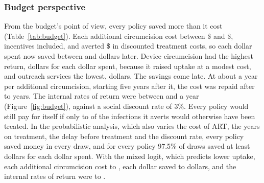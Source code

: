 \documentclass[11pt]{article}
\numberwithin{equation}{section}\numberwithin{figure}{section}\numberwithin{table}{section}
\begin{document}
\subsubsection{Budget perspective}
From the budget's point of view, every policy saved more than it cost (Table~\ref{tab:budget}). Each additional circumcision cost between \$\mmccostPerMMCmin{} and \$\mmccostPerMMCmax, incentives included, and averted \$\mmctxPerMMC{} in discounted treatment costs, so each dollar spent now saved between \mmcBreturnMin{} and \mmcBreturnMax{} dollars later. Device circumcision had the highest return, \mmcBPTwoReturn{} dollars for each dollar spent, because it raised uptake at a modest cost, and outreach services the lowest, \mmcBPOneReturn{} dollars. The savings come late. At about \mmcBartPerYear{} a year per additional circumcision, starting five years after it, the cost was repaid after \mmcBpaybackMin{} to \mmcBpaybackMax{} years. The internal rates of return were between \mmcBirrMin{} and \mmcBirrMax{} a year (Figure~\ref{fig:budget}), against a social discount rate of 3\%. Every policy would still pay for itself if only \mmcBcoverMin{} to \mmcBcoverMax{} of the infections it averts would otherwise have been treated. In the probabilistic analysis, which also varies the cost of ART, the years on treatment, the delay before treatment and the discount rate, every policy saved money in every draw, and for every policy 97.5\% of draws saved at least \mmcBreturnLoMin{} dollars for each dollar spent. With the mixed logit, which predicts lower uptake, each additional circumcision cost \mmcBMXperMMCmin{} to \mmcBMXperMMCmax, each dollar saved \mmcBMXreturnMin{} to \mmcBMXreturnMax{} dollars, and the internal rates of return were \mmcBMXirrMin{} to \mmcBMXirrMax.

\begin{table}[!htbp]
\centering
\caption{Budget perspective: what the health budget pays now and saves later, per uncircumcised man (conditional logit, 2017 US\$). 95\% intervals of the return from the probabilistic analysis. Payback: years after the circumcision until the undiscounted ART costs averted equal its cost. ART coverage needed: the share of averted infections that must otherwise have been treated for the policy to pay for itself.}\label{tab:budget}
\small
{}
\end{table}
\end{document}
